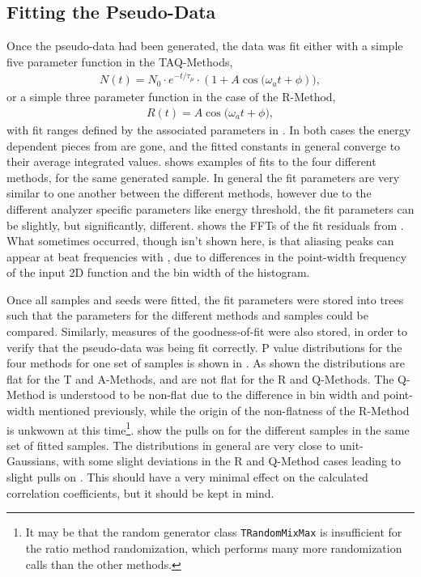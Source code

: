 \subsection{Fitting the Pseudo-Data}


Once the pseudo-data had been generated, the data was fit either with a simple five parameter function in the TAQ-Methods,
\begin{align}
    N(t) = N_{0} \cdot e^{-t/\tau_{\mu}} \cdot (1 + A \cos{(\omega_{a}t + \phi})),
\label{eq:fiveParFit}
\end{align}
or a simple three parameter function in the case of the R-Method,
\begin{align}
    R(t) =A \cos{(\omega_{a}t + \phi}),
\label{eq:ratioFit}
\end{align}
with fit ranges defined by the associated parameters in . In both cases the energy dependent pieces from  are gone, and the fitted constants in general converge to their average integrated values.  shows examples of fits to the four different methods, for the same generated sample. In general the fit parameters are very similar to one another between the different methods, however due to the different analyzer specific parameters like energy threshold, the fit parameters can be slightly, but significantly, different.  shows the FFTs of the fit residuals from . What sometimes occurred, though isn't shown here, is that aliasing peaks can appear at beat frequencies with \wa, due to differences in the point-width frequency of the input 2D function and the bin width of the histogram. 

Once all samples and seeds were fitted, the fit parameters were stored into \ROOT trees such that the parameters for the different methods and samples could be compared. Similarly, measures of the goodness-of-fit were also stored, in order to verify that the pseudo-data was being fit correctly. P value distributions for the four methods for one set of samples is shown in . As shown the distributions are flat for the T and A-Methods, and are not flat for the R and Q-Methods. The Q-Method is understood to be non-flat due to the difference in bin width and point-width mentioned previously, while the origin of the non-flatness of the R-Method is unkwown at this time\footnote{It may be that the random generator class \texttt{TRandomMixMax} is insufficient for the ratio method randomization, which performs many more randomization calls than the other methods.}.  show the pulls on \R for the different samples in the same set of fitted samples. The distributions in general are very close to unit-Gaussians, with some slight deviations in the R and Q-Method cases leading to slight pulls on \R. This should have a very minimal effect on the calculated correlation coefficients, but it should be kept in mind.


